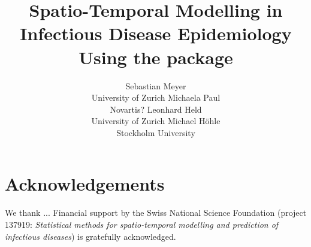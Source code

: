 \documentclass[article]{jss}
\author{Sebastian Meyer\\University of Zurich \And
        Michaela Paul\\Novartis? \And
        Leonhard Held\\University of Zurich \And
        Michael Höhle\\Stockholm University}
\title{Spatio-Temporal Modelling in Infectious Disease Epidemiology Using the
  \proglang{R} package \pkg{surveillance}}
\begin{document}









\section*{Acknowledgements}

We thank ...
Financial support by the Swiss National Science Foundation
(project 137919: \emph{Statistical methods for spatio-temporal modelling and
  prediction of infectious diseases}) is gratefully acknowledged.



\nocite{R:2.15.3}
\iffalse
\fi
\end{document}
